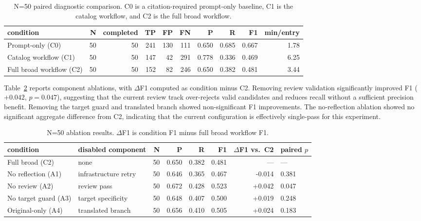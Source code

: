 \documentclass[conference]{IEEEtran}
\newcommand{\bmode}{broad}
\begin{document}
\begin{table}[t]
\centering
\caption{N=50 paired diagnostic comparison. C0 is a citation-required prompt-only baseline, C1 is the catalog workflow, and C2 is the full \bmode{} workflow.}
\label{tab:n50-main}
\setlength{\tabcolsep}{4pt}
\renewcommand{\arraystretch}{1.08}
\footnotesize
\begin{tabular}{lrrrrrrrrr}
\toprule
condition & N & completed & TP & FP & FN & P & R & F1 & min/entry \\
\midrule
Prompt-only (C0) & 50 & 50 & 241 & 130 & 111 & 0.650 & 0.685 & 0.667 & 1.78 \\
Catalog workflow (C1) & 50 & 50 & 147 & 42 & 291 & 0.778 & 0.336 & 0.469 & 6.25 \\
Full \bmode{} workflow (C2) & 50 & 50 & 152 & 82 & 246 & 0.650 & 0.382 & 0.481 & 3.44 \\
\bottomrule
\end{tabular}
\end{table}

Table~\ref{tab:n50-ablation} reports component ablations, with $\Delta$F1 computed as condition minus C2. Removing review validation significantly improved F1 ($+0.042$, $p=0.047$), suggesting that the current review track over-rejects valid candidates and reduces recall without a sufficient precision benefit. Removing the target guard and translated branch showed non-significant F1 improvements. The no-reflection ablation showed no significant aggregate difference from C2, indicating that the current configuration is effectively single-pass for this experiment.

\begin{table}[t]
\centering
\caption{N=50 ablation results. $\Delta$F1 is condition F1 minus full \bmode{} workflow F1.}
\label{tab:n50-ablation}
\setlength{\tabcolsep}{3.5pt}
\renewcommand{\arraystretch}{1.08}
\footnotesize
\begin{tabular}{llrrrrrl}
\toprule
condition & disabled component & N & P & R & F1 & $\Delta$F1 vs.\ C2 & paired $p$ \\
\midrule
Full \bmode{} (C2) & none & 50 & 0.650 & 0.382 & 0.481 & --- & --- \\
No reflection (A1) & infrastructure retry & 50 & 0.646 & 0.365 & 0.467 & -0.014 & 0.381 \\
No review (A2) & review pass & 50 & 0.672 & 0.428 & 0.523 & +0.042 & 0.047 \\
No target guard (A3) & target specificity & 50 & 0.648 & 0.407 & 0.500 & +0.019 & 0.248 \\
Original-only (A4) & translated branch & 50 & 0.656 & 0.410 & 0.505 & +0.024 & 0.183 \\
\bottomrule
\end{tabular}
\end{table}
\end{document}
